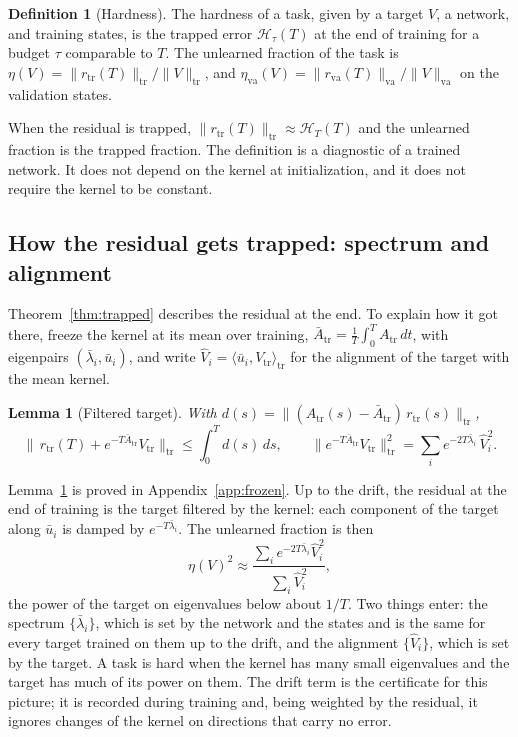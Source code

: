 \documentclass[11pt]{article}
\newtheorem{lemma}{Lemma}
\theoremstyle{definition}
\newtheorem{definition}{Definition}
\theoremstyle{remark}
\newcommand{\Hard}{\mathcal{H}}
\newcommand{\tr}{\mathrm{tr}}
\newcommand{\va}{\mathrm{va}}
\begin{document}
\begin{definition}[Hardness]\label{def:hardness}
The hardness of a task, given by a target $V$, a network, and training states, is the trapped error $\Hard_\tau(T)$ at the end of training for a budget $\tau$ comparable to $T$.
The unlearned fraction of the task is $\eta(V) = \|r_\tr(T)\|_\tr/\|V\|_\tr$, and $\eta_\va(V) = \|r_\va(T)\|_\va/\|V\|_\va$ on the validation states.
\end{definition}

When the residual is trapped, $\|r_\tr(T)\|_\tr \approx \Hard_T(T)$ and the unlearned fraction is the trapped fraction.
The definition is a diagnostic of a trained network.
It does not depend on the kernel at initialization, and it does not require the kernel to be constant.

\subsection{How the residual gets trapped: spectrum and alignment}

Theorem~\ref{thm:trapped} describes the residual at the end.
To explain how it got there, freeze the kernel at its mean over training, $\bar A_\tr = \tfrac1T\int_0^T A_\tr\,dt$, with eigenpairs $(\bar\lambda_i,\bar u_i)$, and write $\hat V_i = \langle\bar u_i, V_\tr\rangle_\tr$ for the alignment of the target with the mean kernel.

\begin{lemma}[Filtered target]\label{lem:frozen}
With $d(s) = \|(A_\tr(s) - \bar A_\tr)\,r_\tr(s)\|_\tr$,
\begin{equation}\label{eq:frozen}
\Big\|\,r_\tr(T) + e^{-T\bar A_\tr}V_\tr\Big\|_\tr \le \int_0^T d(s)\,ds, \qquad \big\|e^{-T\bar A_\tr}V_\tr\big\|_\tr^2 = \sum_i e^{-2T\bar\lambda_i}\,\hat V_i^2 .
\end{equation}
\end{lemma}

Lemma~\ref{lem:frozen} is proved in Appendix~\ref{app:frozen}.
Up to the drift, the residual at the end of training is the target filtered by the kernel: each component of the target along $\bar u_i$ is damped by $e^{-T\bar\lambda_i}$.
The unlearned fraction is then
\begin{equation}\label{eq:eta-spectral}
\eta(V)^2 \approx \frac{\sum_i e^{-2T\bar\lambda_i}\hat V_i^2}{\sum_i \hat V_i^2},
\end{equation}
the power of the target on eigenvalues below about $1/T$.
Two things enter: the spectrum $\{\bar\lambda_i\}$, which is set by the network and the states and is the same for every target trained on them up to the drift, and the alignment $\{\hat V_i\}$, which is set by the target.
A task is hard when the kernel has many small eigenvalues and the target has much of its power on them.
The drift term is the certificate for this picture; it is recorded during training and, being weighted by the residual, it ignores changes of the kernel on directions that carry no error.
\end{document}

